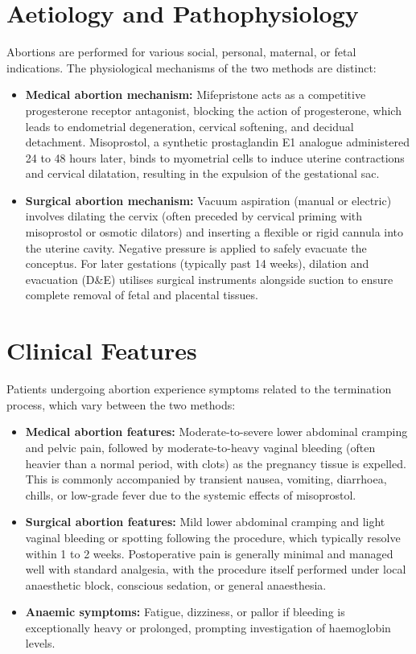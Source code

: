 \section*{Aetiology and Pathophysiology}
Abortions are performed for various social, personal, maternal, or fetal indications. The physiological mechanisms of the two methods are distinct:
\begin{itemize}
    \item \textbf{Medical abortion mechanism:} Mifepristone acts as a competitive progesterone receptor antagonist, blocking the action of progesterone, which leads to endometrial degeneration, cervical softening, and decidual detachment. Misoprostol, a synthetic prostaglandin E1 analogue administered 24 to 48 hours later, binds to myometrial cells to induce uterine contractions and cervical dilatation, resulting in the expulsion of the gestational sac.
    \item \textbf{Surgical abortion mechanism:} Vacuum aspiration (manual or electric) involves dilating the cervix (often preceded by cervical priming with misoprostol or osmotic dilators) and inserting a flexible or rigid cannula into the uterine cavity. Negative pressure is applied to safely evacuate the conceptus. For later gestations (typically past 14 weeks), dilation and evacuation (D\&E) utilises surgical instruments alongside suction to ensure complete removal of fetal and placental tissues.
\end{itemize}

\section*{Clinical Features}
Patients undergoing abortion experience symptoms related to the termination process, which vary between the two methods:
\begin{itemize}
    \item \textbf{Medical abortion features:} Moderate-to-severe lower abdominal cramping and pelvic pain, followed by moderate-to-heavy vaginal bleeding (often heavier than a normal period, with clots) as the pregnancy tissue is expelled. This is commonly accompanied by transient nausea, vomiting, diarrhoea, chills, or low-grade fever due to the systemic effects of misoprostol.
    \item \textbf{Surgical abortion features:} Mild lower abdominal cramping and light vaginal bleeding or spotting following the procedure, which typically resolve within 1 to 2 weeks. Postoperative pain is generally minimal and managed well with standard analgesia, with the procedure itself performed under local anaesthetic block, conscious sedation, or general anaesthesia.
    \item \textbf{Anaemic symptoms:} Fatigue, dizziness, or pallor if bleeding is exceptionally heavy or prolonged, prompting investigation of haemoglobin levels.
\end{itemize}

